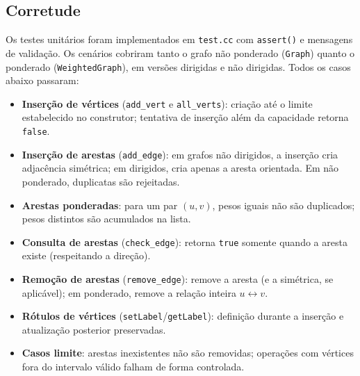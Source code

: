 \documentclass{sbc2023}%
\begin{document}
\subsection{Corretude}
Os testes unitários foram implementados em \texttt{test.cc} com
\texttt{assert()} e mensagens de validação. Os cenários cobriram tanto o grafo
não ponderado (\texttt{Graph}) quanto o ponderado (\texttt{WeightedGraph}), em
versões dirigidas e não dirigidas. Todos os casos abaixo passaram:

\begin{itemize}
  \item \textbf{Inserção de vértices} (\texttt{add\_vert} e \texttt{all\_verts}):
        criação até o limite estabelecido no construtor; tentativa de inserção
        além da capacidade retorna \texttt{false}.
  \item \textbf{Inserção de arestas} (\texttt{add\_edge}):
        em grafos não dirigidos, a inserção cria adjacência simétrica;
        em dirigidos, cria apenas a aresta orientada. Em não ponderado,
        duplicatas são rejeitadas.
  \item \textbf{Arestas ponderadas}: para um par \((u,v)\), pesos iguais não
        são duplicados; pesos distintos são acumulados na lista.
  \item \textbf{Consulta de arestas} (\texttt{check\_edge}): retorna
        \texttt{true} somente quando a aresta existe (respeitando a direção).
  \item \textbf{Remoção de arestas} (\texttt{remove\_edge}): remove a aresta
        (e a simétrica, se aplicável); em ponderado, remove a relação inteira
        \(u\leftrightarrow v\).
  \item \textbf{Rótulos de vértices} (\texttt{setLabel}/\texttt{getLabel}):
        definição durante a inserção e atualização posterior preservadas.
  \item \textbf{Casos limite}: arestas inexistentes não são removidas; operações
        com vértices fora do intervalo válido falham de forma controlada.
\end{itemize}
\end{document}
